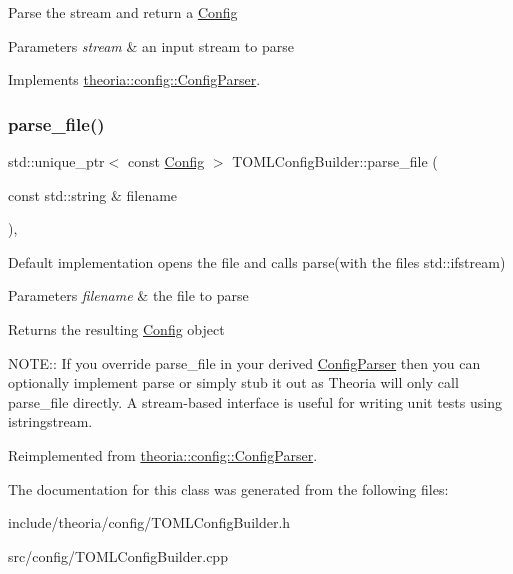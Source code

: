 Parse the stream and return a \hyperlink{classtheoria_1_1config_1_1Config}{Config} 
\begin{DoxyParams}{Parameters}
{\em stream} & an input stream to parse \\
\hline
\end{DoxyParams}


Implements \hyperlink{classtheoria_1_1config_1_1ConfigParser_af0ccd3cc2202c3d588a977c611dfa988}{theoria\+::config\+::\+Config\+Parser}.

\mbox{\label{classtheoria_1_1config_1_1TOMLConfigBuilder_afba5445b56e12b39cf1b266627a27f58}} 
\subsubsection{\texorpdfstring{parse\+\_\+file()}{parse\_file()}}
{\footnotesize\ttfamily std\+::unique\+\_\+ptr$<$ const \hyperlink{classtheoria_1_1config_1_1Config}{Config} $>$ T\+O\+M\+L\+Config\+Builder\+::parse\+\_\+file (\begin{DoxyParamCaption}\item[{const std\+::string \&}]{filename }\end{DoxyParamCaption})\hspace{0.3cm}{\ttfamily [override]}, {\ttfamily [virtual]}}

Default implementation opens the file and calls parse(with the file\textquotesingle{}s std\+::ifstream)


\begin{DoxyParams}{Parameters}
{\em filename} & the file to parse \\
\hline
\end{DoxyParams}
\begin{DoxyReturn}{Returns}
the resulting \hyperlink{classtheoria_1_1config_1_1Config}{Config} object
\end{DoxyReturn}
N\+O\+TE\+:\+: If you override parse\+\_\+file in your derived \hyperlink{classtheoria_1_1config_1_1ConfigParser}{Config\+Parser} then you can optionally implement parse or simply stub it out as Theoria will only call parse\+\_\+file directly. A stream-\/based interface is useful for writing unit tests using istringstream. 

Reimplemented from \hyperlink{classtheoria_1_1config_1_1ConfigParser_a4eca80a9831324237f2a2aa9a5018c89}{theoria\+::config\+::\+Config\+Parser}.



The documentation for this class was generated from the following files\+:\begin{DoxyCompactItemize}
\item 
include/theoria/config/T\+O\+M\+L\+Config\+Builder.\+h\item 
src/config/T\+O\+M\+L\+Config\+Builder.\+cpp\end{DoxyCompactItemize}
